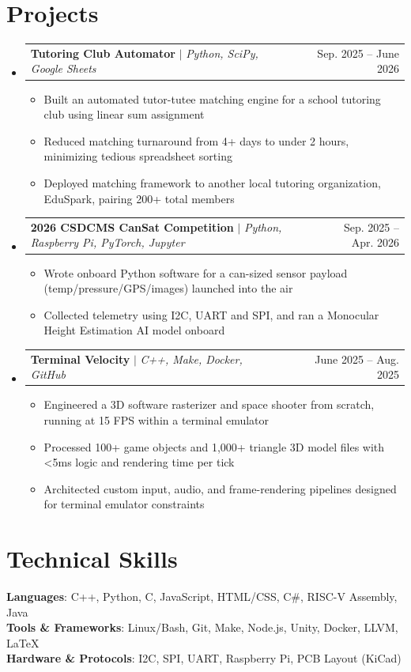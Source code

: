 \documentclass[letterpaper,11pt]{article}
\makeatletter
\newcommand{\resumeItem}[1]{
  \item\small{
    {#1 \vspace{-2pt}}
  }
}
\newcommand{\resumeProjectHeading}[2]{
    \item
    \begin{tabular*}{0.97\textwidth}{l@{\extracolsep{\fill}}r}
      \small#1 & #2 \\
    \end{tabular*}\vspace{-7pt}
}
\newcommand{\resumeSubHeadingListStart}{\begin{itemize}[leftmargin=0.15in, label={}]}
\newcommand{\resumeSubHeadingListEnd}{\end{itemize}}
\newcommand{\resumeItemListStart}{\begin{itemize}}
\newcommand{\resumeItemListEnd}{\end{itemize}\vspace{-5pt}}
\makeatother
\begin{document}
\section{Projects}
    \resumeSubHeadingListStart
      \resumeProjectHeading
          {\textbf{Tutoring Club Automator} $|$ \emph{Python, SciPy, Google Sheets}}{Sep. 2025 -- June 2026}
          \resumeItemListStart
            \resumeItem{Built an automated tutor-tutee matching engine for a school tutoring club using linear sum assignment}
            \resumeItem{Reduced matching turnaround from 4+ days to under 2 hours, minimizing tedious spreadsheet sorting}
            \resumeItem{Deployed matching framework to another local tutoring organization, EduSpark, pairing 200+ total members}
          \resumeItemListEnd
      \resumeProjectHeading
          {\textbf{2026 CSDCMS CanSat Competition} $|$ \emph{Python, Raspberry Pi, PyTorch, Jupyter}}{Sep. 2025 -- Apr. 2026}
          \resumeItemListStart
            \resumeItem{Wrote onboard Python software for a can-sized sensor payload (temp/pressure/GPS/images) launched into the air}
            \resumeItem{Collected telemetry using I2C, UART and SPI, and ran a Monocular Height Estimation AI model onboard}
          \resumeItemListEnd
      \resumeProjectHeading
          {\textbf{Terminal Velocity} $|$ \emph{C++, Make, Docker, GitHub}}{June 2025 -- Aug. 2025}
          \resumeItemListStart
            \resumeItem{Engineered a 3D software rasterizer and space shooter from scratch, running at 15 FPS within a terminal emulator}
            \resumeItem{Processed 100+ game objects and 1,000+ triangle 3D model files with \textless5ms logic and rendering time per tick}
            \resumeItem{Architected custom input, audio, and frame-rendering pipelines designed for terminal emulator constraints}
          \resumeItemListEnd
    \resumeSubHeadingListEnd



%
\section{Technical Skills}
 \begin{itemize}[leftmargin=0.15in, label={}]
    \small{\item{
     \textbf{Languages}{: C++, Python, C, JavaScript, HTML/CSS, C\#, RISC-V Assembly, Java} \\
     \textbf{Tools \& Frameworks}{: Linux/Bash, Git, Make, Node.js, Unity, Docker, LLVM, LaTeX } \\
     \textbf{Hardware \& Protocols}{: I2C, SPI, UART, Raspberry Pi, PCB Layout (KiCad)}
    }}
 \end{itemize}
\end{document}
